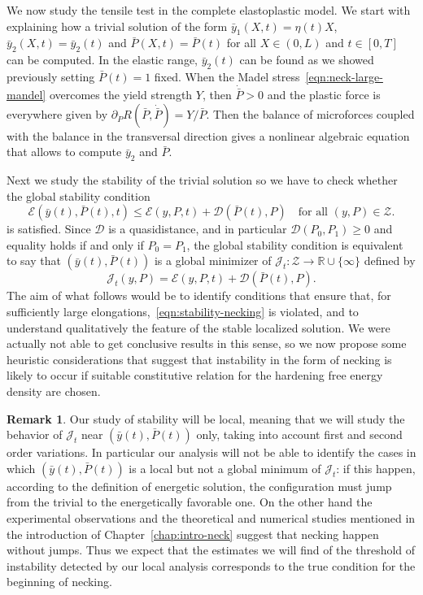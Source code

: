 \documentclass[a4paper,10pt,twoside]{amsbook}
\numberwithin{section}{chapter}
\numberwithin{equation}{chapter}
\theoremstyle{definition}
\newtheorem{rmk}[prop]{Remark}
\begin{document}
We now study the tensile test in the complete elastoplastic model. We start with explaining how a trivial solution of the form $\bar{y}_1(X,t)=\eta(t)X$, $\bar{y}_2(X,t)=\bar{y}_2(t)$ and $\bar P(X,t)=\bar{P}(t)$ for all $X\in(0,L)$ and $t\in[0,T]$ can be computed. In the elastic range, $\bar y_2(t)$ can be found as we showed previously setting $\bar P(t)=1$ fixed. When the Madel stress~\eqref{eqn:neck-large-mandel} overcomes the yield strength $Y$, then $\dot{\bar P}>0$ and the plastic force is everywhere given by $\partial_{\dot P}R(\bar P,\dot{\bar P})=Y/\bar P$. Then the balance of microforces coupled with the balance in the transversal direction gives a nonlinear algebraic equation that allows to compute $\bar y_2$ and $\bar P$.

Next we study the stability of the trivial solution so we have to check whether the global stability condition
\begin{equation}
\label{eqn:stability-necking}
\mathcal{E}(\bar{y}(t),\bar{P}(t),t)\le\mathcal{E}(y,P,t)+\mathcal{D}(\bar{P}(t),P)\quad\text{for all $(y,P)\in\mathscr{Z}$}.
\end{equation}
is satisfied. Since $\mathcal{D}$ is a quasidistance, and in particular $\mathcal{D}(P_0,P_1)\ge0$ and equality holds if and only if $P_0=P_1$, the global stability condition is equivalent to say that $(\bar y(t),\bar P(t))$ is a global minimizer of $\mathcal{J}_t\colon\mathscr{Z}\to\mathbb{R}\cup\{\infty\}$ defined by
\[
\mathcal{J}_t(y,P)=\mathcal{E}(y,P,t)+\mathcal{D}(\bar P(t),P).
\]
The aim of what follows would be to identify conditions that ensure that, for sufficiently large elongations,~\eqref{eqn:stability-necking} is violated, and to understand qualitatively the feature of the stable localized solution. We were actually not able to get conclusive results in this sense, so we now propose some heuristic considerations that suggest that instability in the form of necking is likely to occur if suitable constitutive relation for the hardening free energy density are chosen.
\begin{rmk}
Our study of stability will be local, meaning that we will study the behavior of $\mathcal{J}_t$ near $(\bar{y}(t),\bar{P}(t))$ only, taking into account first and second order variations. In particular our analysis will not be able to identify the cases in which $(\bar{y}(t),\bar{P}(t))$ is a local but not a global minimum of $\mathcal{J}_t$: if this happen, according to the definition of energetic solution, the configuration must jump from the trivial to the energetically favorable one. On the other hand the experimental observations and the theoretical and numerical studies mentioned in the introduction of Chapter~\ref{chap:intro-neck} suggest that necking happen without jumps. Thus we expect that the estimates we will find of the threshold of instability detected by our local analysis corresponds to the true condition for the beginning of necking.
\end{rmk}
\end{document}
